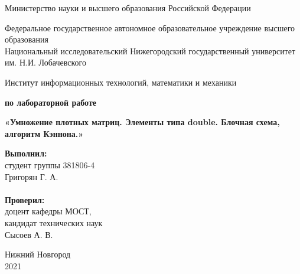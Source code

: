 \documentclass{report}
\begin{document}
\begin{titlepage}

\begin{center}
Министерство науки и высшего образования Российской Федерации
\end{center}

\begin{center}
Федеральное государственное автономное образовательное учреждение высшего образования \\
Национальный исследовательский Нижегородский государственный университет им. Н.И. Лобачевского
\end{center}

\begin{center}
Институт информационных технологий, математики и механики
\end{center}

\vspace{4em}

\begin{center}
\textbf{ по лабораторной работе} \\
\end{center}
\begin{center}
\textbf{\Large«Умножение плотных матриц. Элементы типа double. Блочная схема, алгоритм Кэннона.»} \\
\end{center}

\vspace{4em}

\newbox{\lbox}
\newlength{\maxl}
\setlength{\maxl}{\wd\lbox}
\hfill\parbox{7cm}{
\hspace*{5cm}\hspace*{-5cm}\textbf{Выполнил:} \\ студент группы 381806-4 \\ Григорян Г. А. \\
\\
\hspace*{5cm}\hspace*{-5cm}\textbf{Проверил:}\\ доцент кафедры МОСТ, \\ кандидат технических наук \\ Сысоев А. В.\\}

\vspace{\fill}

\begin{center} Нижний Новгород \\ 2021 \end{center}

\end{titlepage}
\end{document}
